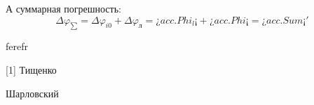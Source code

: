 \documentclass[14pt,a4paper,russian]{scrartcl}
\begin{document}
        А суммарная погрешность:
        \[ \Delta\varphi_{\sum} = \Delta\varphi_{i0}  + \Delta\varphi_{\text{л}} 
        = ¿acc.Phi_l¡ + ¿acc.Phi¡ = ¿acc.Sum¡' \]
        
        
        

        
        
        
        
        
        
        
        

        
        
\newpage
        ferefr
\renewcommand\refname{Список использованных источников}

        
[1] Тищенко \par
[2] Шарловский
    
\end{document}
